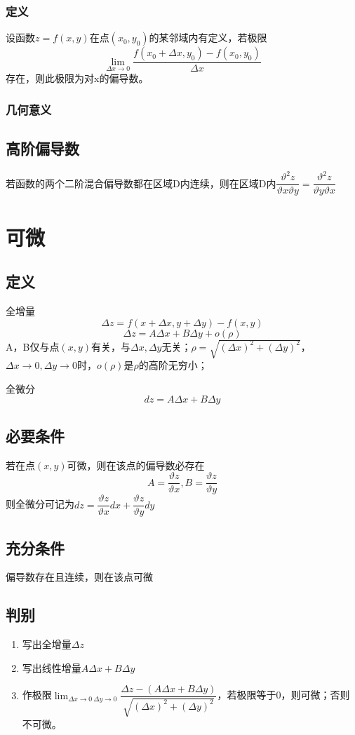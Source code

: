 \subsubsection{定义}
设函数\(z = f(x, y)\)在点\((x_0, y_0)\)的某邻域内有定义，若极限\[\lim_{\Delta x \to 0}\dfrac{f(x_0 + \Delta x, y_0) - f(x_0, y_0)}{\Delta x}\]
存在，则此极限为对x的偏导数。


\subsubsection{几何意义}


\subsection{高阶偏导数}
若函数的两个二阶混合偏导数都在区域D内连续，则在区域D内\(\dfrac{\vartheta^2z}{\vartheta x\vartheta y} = \dfrac{\vartheta^2z}{\vartheta y\vartheta x}\)


\section{可微}

\subsection{定义}
全增量\[\Delta z = f(x + \Delta x, y + \Delta y) - f(x, y)\]
\[\Delta z = A\Delta x + B\Delta y + o(\rho)\]
A，B仅与点\((x, y)\)有关，与\(\Delta x,\Delta y\)无关；\(\rho = \sqrt{(\Delta x)^2 + (\Delta y)^2}\)，\(\Delta x \to 0,\Delta y \to 0\)时，\(o(\rho)\)是\(\rho\)的高阶无穷小；

全微分\[dz = A\Delta x + B\Delta y\]


\subsection{必要条件}
若在点\((x, y)\)可微，则在该点的偏导数必存在\[A = \dfrac{\vartheta z}{\vartheta x}, B = \dfrac{\vartheta z}{\vartheta y}\]
则全微分可记为\(dz = \dfrac{\vartheta z}{\vartheta x}dx + \dfrac{\vartheta z}{\vartheta y}dy\)


\subsection{充分条件}
偏导数存在且连续，则在该点可微


\subsection{判别}
\begin{enumerate}
    \item 写出全增量\(\Delta z\)
    \item 写出线性增量\(A\Delta x + B\Delta y\)
    \item 作极限\(\displaystyle\lim_{\Delta x \to 0\ \Delta y \to 0}\dfrac{\Delta z - (A\Delta x + B\Delta y)}{\sqrt{(\Delta x)^2 + (\Delta y)^2}}\)，若极限等于0，则可微；否则不可微。
\end{enumerate}



